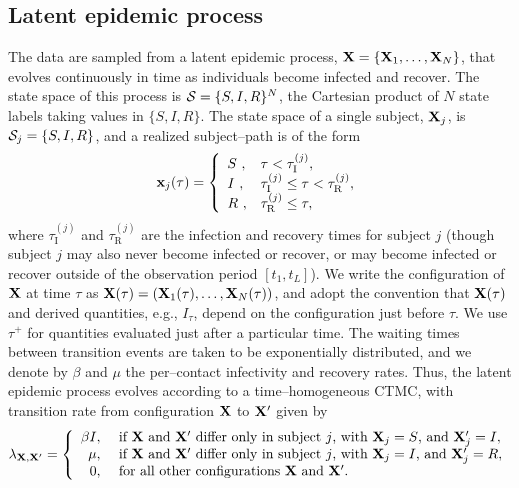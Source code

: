 \subsection{Latent epidemic process}
\label{subsec:bda_pop_proc}
The data are sampled from a latent epidemic process, $ \mathbf{X} = \lbrace \mathbf{X}_1,\dots,\mathbf{X}_N\rbrace $, that evolves continuously in time  as individuals become infected and recover. The state space of this process is $ \mathcal{S} = \lbrace S,I,R\rbrace^N $, the Cartesian product of $ N $ state labels taking values in $ \lbrace S,I,R\rbrace $. The state space of a single subject, $ \mathbf{X}_j $, is $\mathcal{S}_j = \lbrace S, I, R\rbrace $, and a realized subject--path is of the form 
\begin{equation} \mathbf{x}_j(\tau) = \left \lbrace \begin{array}{ll}
S\ ,& \tau < \tau^{(j)}_{\mathrm{I}},\\
I\ ,& \tau^{(j)}_{\mathrm{I}} \leq \tau < \tau^{(j)}_{\mathrm{R}},\\
R\ ,& \tau^{(j)}_{\mathrm{R}} \leq \tau,
\end{array} \right . \end{equation} 
where $ \tau^{(j)}_{\mathrm{I}} $ and $ \tau^{(j)}_{\mathrm{R}} $ are the infection and recovery times for subject $ j $ (though subject $ j $ may also never become infected or recover, or may become infected or recover outside of the observation period $ [t_1,t_L] $). We write the configuration of $ \mathbf{X} $ at time $ \tau $ as $ \mathbf{X}(\tau) = \left (\mathbf{X}_1(\tau),\dots,\mathbf{X}_N(\tau)\right ) $, and adopt the convention that $ \mathbf{X}(\tau) $ and derived quantities, e.g., $ I_\tau $, depend on the configuration just before $ \tau $. We  use $ \tau^+ $ for quantities evaluated just after a particular time. The waiting times between transition events are taken to be exponentially distributed, and we denote by $ \beta $ and $ \mu $ the per--contact infectivity and recovery rates. Thus, the latent epidemic process evolves according to a time--homogeneous CTMC, with transition rate from configuration $ \mathbf{X} $ to $ \mathbf{X}^\prime $ given by
\begin{equation}
\lambda_{\mathbf{X},\mathbf{X}^\prime} = \left \lbrace \begin{array}{rl}
\beta I,\ &\text{if } \mathbf{X}\ \text{and } \mathbf{X}^\prime\ \text{differ only in subject }j \text{, with }\mathbf{X}_j=S\text{, and }\mathbf{X}_j^\prime=I,\\
\mu,\ &\text{if } \mathbf{X}\ \text{and } \mathbf{X}^\prime\ \text{differ only in subject }j \text{, with }\mathbf{X}_j=I\text{, and }\mathbf{X}_j^\prime=R,\\
0,\ & \text{for all other configurations }\mathbf{X}\ \text{and }\mathbf{X}^\prime.
\end{array}\right.
\end{equation}
